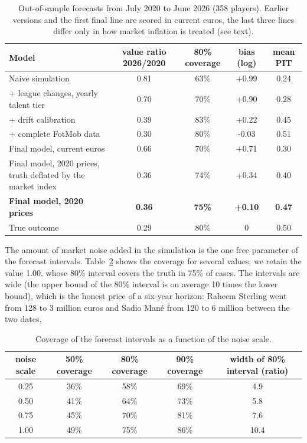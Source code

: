 \begin{table}[h]
\centering
\begin{tabular}{lcccc}
\toprule
Model & value ratio 2026/2020 & 80\% coverage & bias (log) & mean PIT \\
\midrule
Naive simulation & 0.81 & 63\% & +0.99 & 0.24 \\
+ league changes, yearly talent tier & 0.70 & 70\% & +0.90 & 0.28 \\
+ drift calibration & 0.39 & 83\% & +0.22 & 0.45 \\
+ complete FotMob data & 0.30 & 80\% & -0.03 & 0.51 \\
\midrule
Final model, current euros & 0.66 & 70\% & +0.71 & 0.30 \\
Final model, 2020 prices, truth deflated by the market index & 0.36 & 74\% & +0.34 & 0.40 \\
\textbf{Final model, 2020 prices} & \textbf{0.36} & \textbf{75\%} & \textbf{+0.10} & \textbf{0.47} \\
\midrule
True outcome & 0.29 & 80\% & 0 & 0.50 \\
\bottomrule
\end{tabular}
\caption{Out-of-sample forecasts from July 2020 to June 2026 (358 players). Earlier versions and the first final line are scored in current euros, the last three lines differ only in how market inflation is treated (see text).}
\label{tab:backtest}
\end{table}

The amount of market noise added in the simulation is the one free parameter of the forecast intervals. Table~\ref{tab:scale} shows the coverage for several values; we retain the value 1.00, whose 80\% interval covers the truth in 75\% of cases. The intervals are wide (the upper bound of the 80\% interval is on average 10 times the lower bound), which is the honest price of a six-year horizon: Raheem Sterling went from 128 to 3 million euros and Sadio Man\'e from 120 to 6 million between the two dates.

\begin{table}[h]
\centering
\begin{tabular}{ccccc}
\toprule
noise scale & 50\% coverage & 80\% coverage & 90\% coverage & width of 80\% interval (ratio) \\
\midrule
0.25 & 36\% & 58\% & 69\% & 4.9 \\
0.50 & 41\% & 64\% & 73\% & 5.8 \\
0.75 & 45\% & 70\% & 81\% & 7.6 \\
1.00 & 49\% & 75\% & 86\% & 10.4 \\
\bottomrule
\end{tabular}
\caption{Coverage of the forecast intervals as a function of the noise scale.}
\label{tab:scale}
\end{table}



